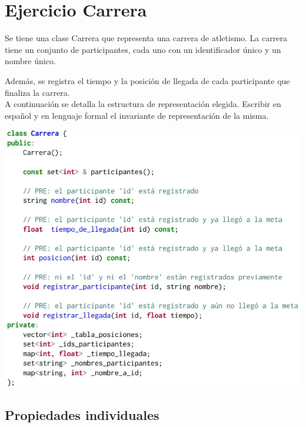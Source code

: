 \documentclass{article}
\begin{document}
    \section*{Ejercicio Carrera}
        Se tiene una clase Carrera que representa una carrera de atletismo. La carrera tiene un conjunto de participantes, cada uno con un identiﬁcador único y un nombre único.
        
        Además, se registra el tiempo y la posición de llegada de cada participante que ﬁnaliza la carrera. \\
        A continuación se detalla la estructura de representación elegida. Escribir en español y en lenguaje formal el invariante de representación de la misma.  
        \begin{center}
            \includegraphics[width=0.8 \linewidth]{img/carrera.png}
        \end{center}
    \newpage
        \subsection*{Propiedades individuales}
\end{document}

